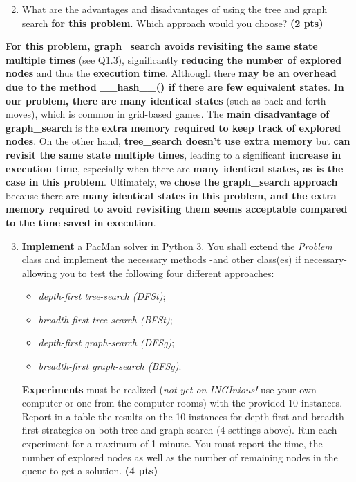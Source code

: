 \documentclass[11pt,a4paper]{report}
\begin{document}
\begin{enumerate}
\setcounter{enumi}{1}
\begin{enumerate}
\setcounter{enumii}{1}
    \item What are the advantages and disadvantages of using the tree and graph search \textbf{for this problem}. Which approach would you choose? \textbf{(2 pts)}
\end{enumerate}
\end{enumerate}

\begin{answers}[4cm]
{\small \textbf{For this problem, graph\_search avoids revisiting the same state multiple times} (see Q1.3), significantly \textbf{reducing the number of explored nodes} and thus the \textbf{execution time}. Although there \textbf{may be an overhead due to the method \_\_hash\_\_() if there are few equivalent states}. \textbf{In our problem, there are many identical states} (such as back-and-forth moves), which is common in grid-based games. The \textbf{main disadvantage of graph\_search} is the \textbf{extra memory required to keep track of explored nodes}.
On the other hand, \textbf{tree\_search doesn't use extra memory} but \textbf{can revisit the same state multiple times}, leading to a significant \textbf{increase in execution time}, especially when there are \textbf{many identical states, as is the case in this problem}.
Ultimately, we \textbf{chose the graph\_search approach} because there are \textbf{many identical states in this problem, and the extra memory required to avoid revisiting them seems acceptable compared to the time saved in execution}.}
\end{answers}



\begin{enumerate}
\setcounter{enumi}{2}
    \item \textbf{Implement} a PacMan solver in Python 3.
			You shall extend the \emph{Problem} class and implement the necessary methods -and other class(es) if necessary- allowing you to test the following four different approaches: 
			\begin{itemize}
			\item \textit{depth-first tree-search (DFSt)};
			\item \textit{breadth-first tree-search (BFSt)};
			\item \textit{depth-first graph-search (DFSg)};
			\item \textit{breadth-first graph-search (BFSg)}. 
			\end{itemize}

    \textbf{Experiments} must be realized (\textit{not yet on INGInious!} use your own computer or one from the computer rooms) with the provided 10 instances. Report in a table the results on the 10 instances for depth-first and breadth-first strategies on both tree and graph search (4 settings above). Run each experiment for a maximum of 1 minute. You must report the time, the number of explored nodes as well as the number of remaining nodes in the queue to get a solution. \textbf{(4 pts)}
\end{enumerate}
\end{document}
